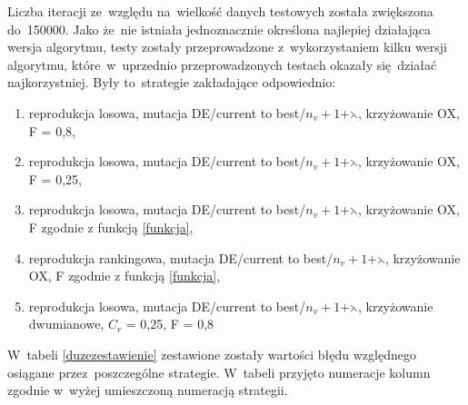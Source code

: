 Liczba iteracji ze~względu na~wielkość danych testowych została zwiększona do~150000. Jako że~nie istniała jednoznacznie określona najlepiej działająca wersja algorytmu, testy zostały przeprowadzone z~wykorzystaniem kilku wersji algorytmu, które~w~uprzednio przeprowadzonych testach okazały się~działać najkorzystniej. Były to~strategie zakładające odpowiednio:\\
\begin{enumerate}
\item reprodukcja losowa, mutacja DE/current to best/$n_{v}+1$+$\leftthreetimes$, krzyżowanie OX, F = 0,8,
\item reprodukcja losowa, mutacja DE/current to best/$n_{v}+1$+$\leftthreetimes$, krzyżowanie OX, F = 0,25,
\item reprodukcja losowa, mutacja DE/current to best/$n_{v}+1$+$\leftthreetimes$, krzyżowanie OX, F zgodnie z funkcją \ref{funkcja},
\item reprodukcja rankingowa, mutacja DE/current to best/$n_{v}+1$+$\leftthreetimes$, krzyżowanie OX, F zgodnie z funkcją \ref{funkcja},
\item reprodukcja losowa, mutacja DE/current to best/$n_{v}+1$+$\leftthreetimes$, krzyżowanie dwumianowe, $C_{r}$ = 0,25, F = 0,8
\end{enumerate}

W~tabeli \ref{duzezestawienie} zestawione zostały wartości błędu względnego osiągane przez~poszczególne strategie. W~tabeli przyjęto numeracje kolumn zgodnie w~wyżej umieszczoną numeracją strategii.

